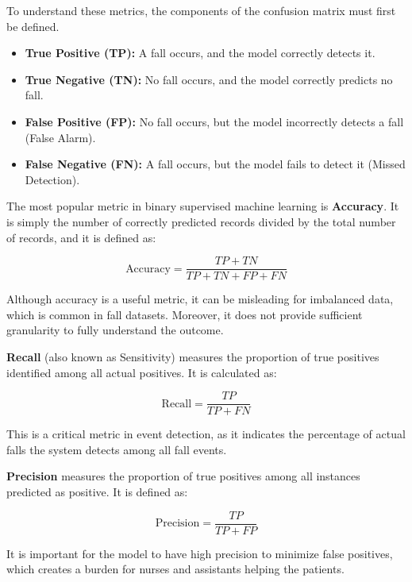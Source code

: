 \documentclass[11pt, a4paper, twoside]{article}
\begin{document}
To understand these metrics, the components of the confusion matrix must first be defined.
\begin{itemize}
    \item \textbf{True Positive (TP):} A fall occurs, and the model correctly detects it.
    \item \textbf{True Negative (TN):} No fall occurs, and the model correctly predicts no fall.
    \item \textbf{False Positive (FP):} No fall occurs, but the model incorrectly detects a fall (False Alarm).
    \item \textbf{False Negative (FN):} A fall occurs, but the model fails to detect it (Missed Detection).
\end{itemize}



The most popular metric in binary supervised machine learning is \textbf{Accuracy}. It is simply the number of correctly predicted records divided by the total number of records, and it is defined as:

\begin{equation}
\text{Accuracy} = \frac{TP + TN}{TP + TN + FP + FN}
\end{equation}

Although accuracy is a useful metric, it can be misleading for imbalanced data, which is common in fall datasets. Moreover, it does not provide sufficient granularity to fully understand the outcome.

\textbf{Recall} (also known as Sensitivity) measures the proportion of true positives identified among all actual positives. It is calculated as:

\begin{equation}
\text{Recall} = \frac{TP}{TP + FN}
\end{equation}

This is a critical metric in event detection, as it indicates the percentage of actual falls the system detects among all fall events.

\textbf{Precision} measures the proportion of true positives among all instances predicted as positive. It is defined as:

\begin{equation}
\text{Precision} = \frac{TP}{TP + FP}
\end{equation}

It is important for the model to have high precision to minimize false positives, which creates a burden for nurses and assistants helping the patients.
\end{document}
